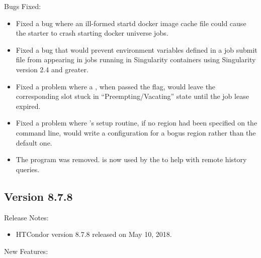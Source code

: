 \noindent Bugs Fixed:

\begin{itemize}

\item Fixed a bug where an ill-formed startd docker image cache file
could cause the starter to crash starting docker universe jobs.

\item Fixed a bug that would prevent environment variables defined in a job
submit file from appearing in jobs running in Singularity containers using
Singularity version 2.4 and greater.

\item Fixed a problem where a , when passed the
 flag, would leave the corresponding slot stuck in
``Preempting/Vacating'' state until the job lease expired.

\item Fixed a problem where 's setup routine, if no region
had been specified on the command line, would write a configuration for a
bogus region rather than the default one.

\item The  program was removed.  is
now used by the  to help with remote history queries.

\end{itemize}

\subsection*{\label{sec:New-8-7-8}Version 8.7.8}

\noindent Release Notes:

\begin{itemize}

\item HTCondor version 8.7.8 released on May 10, 2018.

\end{itemize}


\noindent New Features:

